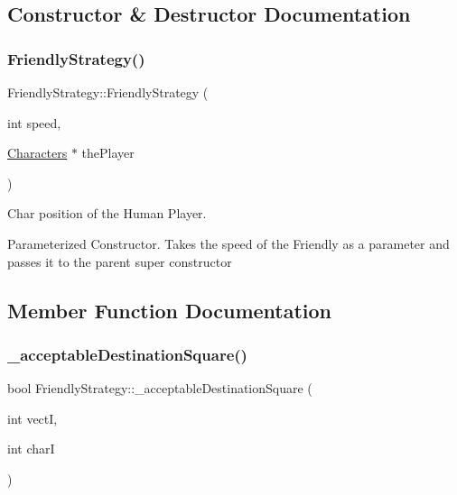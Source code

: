 \subsection{Constructor \& Destructor Documentation}
\hypertarget{class_friendly_strategy_a0a06f0fe84fd38cb762892eee051d44d}{}\label{class_friendly_strategy_a0a06f0fe84fd38cb762892eee051d44d} 
\subsubsection{\texorpdfstring{Friendly\+Strategy()}{FriendlyStrategy()}}
{\footnotesize\ttfamily Friendly\+Strategy\+::\+Friendly\+Strategy (\begin{DoxyParamCaption}\item[{int}]{speed,  }\item[{\hyperlink{class_characters}{Characters} $\ast$}]{the\+Player }\end{DoxyParamCaption})}



Char position of the Human Player. 

Parameterized Constructor. Takes the speed of the Friendly as a parameter and passes it to the parent super constructor 

\subsection{Member Function Documentation}
\hypertarget{class_friendly_strategy_a7490a78b29add77bb9485899b05661b4}{}\label{class_friendly_strategy_a7490a78b29add77bb9485899b05661b4} 
\subsubsection{\texorpdfstring{\+\_\+acceptable\+Destination\+Square()}{\_acceptableDestinationSquare()}}
{\footnotesize\ttfamily bool Friendly\+Strategy\+::\+\_\+acceptable\+Destination\+Square (\begin{DoxyParamCaption}\item[{int}]{vectI,  }\item[{int}]{charI }\end{DoxyParamCaption})\hspace{0.3cm}{\ttfamily [virtual]}}

